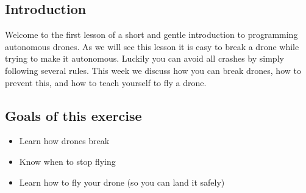 \documentclass{article}
\begin{document}

\subsection*{Introduction}
Welcome to the first lesson of a short and gentle introduction to programming autonomous drones. As we will see this lesson it is easy to break a drone while trying to make it autonomous. Luckily you can avoid all crashes by simply following several rules. This week we discuss how you can break drones, how to prevent this, and how to teach yourself to fly a drone. 

\subsection*{Goals of this exercise}
\begin{itemize}
\item Learn how drones break
\item Know when to stop flying
\item Learn how to fly your drone (so you can land it safely)
\end{itemize}
\end{document}
